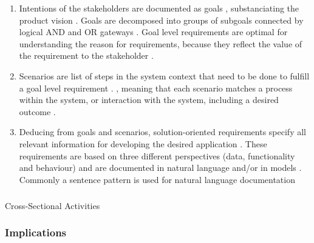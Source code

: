 \begin{enumerate}
    \item Intentions of the stakeholders are documented as goals \parencite[cf.][85]{Pohl.2007}, substanciating the product vision \parencite[cf.][54]{Ebert.2014}. Goals are decomposed into groups of subgoals connected by logical AND and OR gateways \parencite[cf][91]{Pohl.2007}. Goal level requirements are optimal for understanding the reason for requirements, because they reflect the value of the requirement to the stakeholder \parencite[cf.][25]{Lauesen.2008}.
    \item Scenarios are list of steps in the system context that need to be done to fulfill a goal level requirement \parencite[125]{Pohl.2007}.  \parencite[114]{Lauesen.2008}, meaning that each scenario matches a process within the system, or interaction with the system, including a desired outcome \parencite[cf.][114]{Lauesen.2008}.
    \item Deducing from goals and scenarios, solution-oriented requirements specify all relevant information for developing the desired application \parencite[cf.][182-184]{Pohl.2007}. These requirements are based on three different perspectives (data, functionality and behaviour) and are documented in natural language and/or in models \parencite[cf.][184-187]{Pohl.2007}. Commonly a sentence pattern is used for natural language documentation      
\end{enumerate}

\subparagraph{} Cross-Sectional Activities

\subsubsection{Implications}
